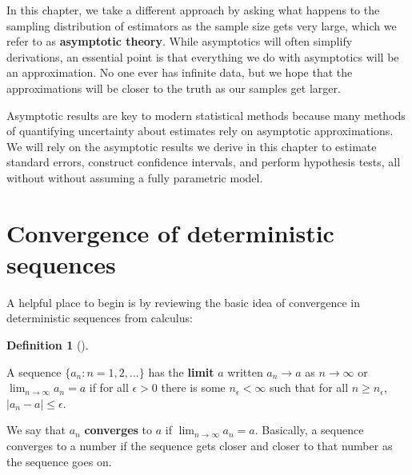 \documentclass[
  letterpaper,
  DIV=11,
  numbers=noendperiod]{scrreprt}
\theoremstyle{definition}
\theoremstyle{definition}
\newtheorem{definition}{Definition}[chapter]
\theoremstyle{plain}
\theoremstyle{remark}
\begin{document}
In this chapter, we take a different approach by asking what happens to
the sampling distribution of estimators as the sample size gets very
large, which we refer to as \textbf{asymptotic theory}. While
asymptotics will often simplify derivations, an essential point is that
everything we do with asymptotics will be an approximation. No one ever
has infinite data, but we hope that the approximations will be closer to
the truth as our samples get larger.

Asymptotic results are key to modern statistical methods because many
methods of quantifying uncertainty about estimates rely on asymptotic
approximations. We will rely on the asymptotic results we derive in this
chapter to estimate standard errors, construct confidence intervals, and
perform hypothesis tests, all without without assuming a fully
parametric model.

\hypertarget{convergence-of-deterministic-sequences}{%
\section{Convergence of deterministic
sequences}\label{convergence-of-deterministic-sequences}}

A helpful place to begin is by reviewing the basic idea of convergence
in deterministic sequences from calculus:

\begin{definition}[]\protect\hypertarget{def-limit}{}\label{def-limit}

A sequence \(\{a_n: n = 1, 2, \ldots\}\) has the \textbf{limit} \(a\)
written \(a_n \rightarrow a\) as \(n\rightarrow \infty\) or
\(\lim_{n\rightarrow \infty} a_n = a\) if for all \(\epsilon > 0\) there
is some \(n_{\epsilon} < \infty\) such that for all
\(n \geq n_{\epsilon}\), \(|a_n - a| \leq \epsilon\).

\end{definition}

We say that \(a_n\) \textbf{converges} to \(a\) if
\(\lim_{n\rightarrow\infty} a_n = a\). Basically, a sequence converges
to a number if the sequence gets closer and closer to that number as the
sequence goes on.
\end{document}
